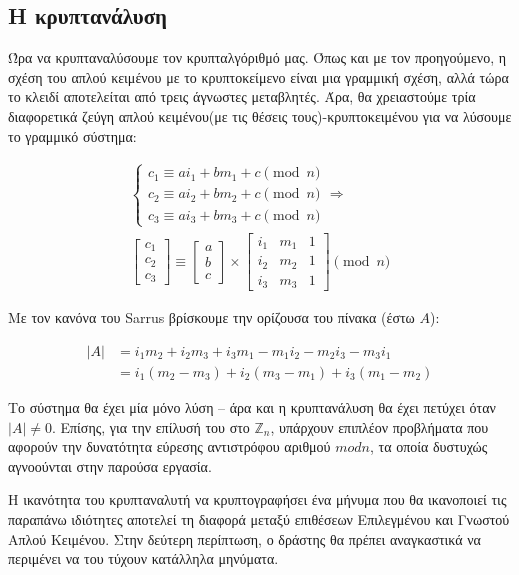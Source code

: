 \documentclass{article}
\begin{document}
\subsection*{Η κρυπτανάλυση}

Ώρα να κρυπταναλύσουμε τον κρυπταλγόριθμό μας. Όπως και με τον προηγούμενο, η σχέση του απλού κειμένου με το κρυπτοκείμενο είναι μια γραμμική σχέση, αλλά τώρα το κλειδί αποτελείται από τρεις άγνωστες μεταβλητές. Άρα, θα χρειαστούμε τρία διαφορετικά ζεύγη απλού κειμένου(με τις θέσεις τους)-κρυπτοκειμένου για να λύσουμε το γραμμικό σύστημα:

\begin{gather*}
\begin{cases}
c_1 \equiv ai_1 + bm_1 + c \pmod n \\
c_2 \equiv ai_2 + bm_2 + c \pmod n \\
c_3 \equiv ai_3 + bm_3 + c \pmod n
\end{cases} \Rightarrow \\
\begin{bmatrix}
c_1 \\ c_2 \\ c_3
\end{bmatrix}
\equiv
\begin{bmatrix}
a \\ b \\ c
\end{bmatrix}
\times
\begin{bmatrix}
i_1 & m_1 & 1 \\
i_2 & m_2 & 1 \\
i_3 & m_3 & 1
\end{bmatrix} \pmod n
\end{gather*}

Με τον κανόνα του Sarrus βρίσκουμε την ορίζουσα του πίνακα (έστω $A$):

\begin{align*}
|A| &= i_1m_2 + i_2m_3 + i_3m_1 - m_1i_2 - m_2i_3 - m_3i_1 \\
&= i_1(m_2 - m_3) + i_2(m_3 - m_1) + i_3(m_1 - m_2)
\end{align*}

Το σύστημα θα έχει μία μόνο λύση -- άρα και η κρυπτανάλυση θα έχει πετύχει όταν $|A| \ne 0$. Επίσης, για την επίλυσή του στο $\mathbb{Z}_n$, υπάρχουν επιπλέον προβλήματα που αφορούν την δυνατότητα εύρεσης αντιστρόφου αριθμού $mod n$, τα οποία δυστυχώς αγνοούνται στην παρούσα εργασία.

Η ικανότητα του κρυπταναλυτή να κρυπτογραφήσει ένα μήνυμα που θα ικανοποιεί τις παραπάνω ιδιότητες αποτελεί τη διαφορά μεταξύ επιθέσεων Επιλεγμένου και Γνωστού Απλού Κειμένου. Στην δεύτερη περίπτωση, ο δράστης θα πρέπει αναγκαστικά να περιμένει να του τύχουν κατάλληλα μηνύματα.
\end{document}
